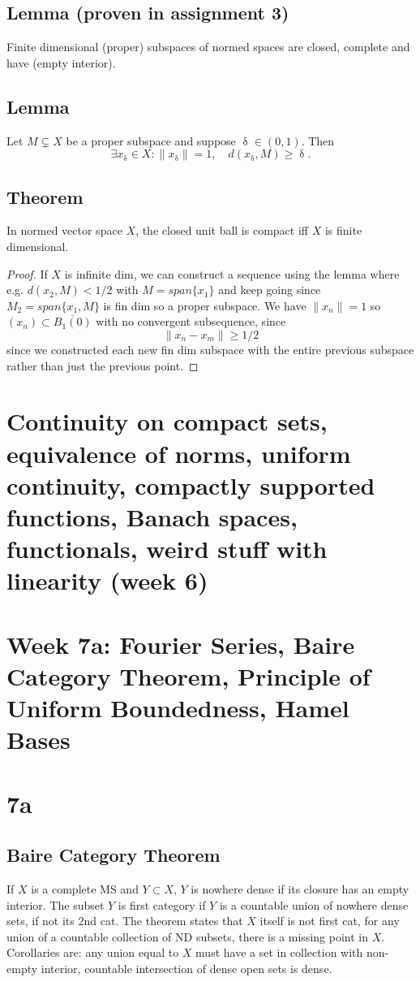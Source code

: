 \documentclass{article}
\DeclareMathOperator\del{\delta}
\begin{document}
\subsection*{Lemma (proven in assignment 3)}
Finite dimensional (proper) subspaces of normed spaces are closed, complete and have (empty interior).
\subsection*{Lemma}
Let $M \subsetneq X$ be a proper subspace and suppose $\del \in (0,1)$. Then $$
\exists x_{\del} \in X: \|x_{\del}\| = 1, \quad d(x_{\del},M) \geq \del.
$$
\subsection*{Theorem}
In normed vector space $X$, the closed unit ball is
compact iff $X$ is finite dimensional.
\begin{proof}
If $X$ is infinite dim, we can construct a sequence using the lemma where e.g. $d(x_2,M) < 1 \slash 2$
with $M = span \{ x_1 \}$ and keep
going since $M_2 = span \{ x_1,M \}$ is fin dim so a proper subspace. We have $\|x_n\| = 1$ so $(x_n) \subset \overline{B_1(0)}$ with no convergent subsequence, since $$
\|x_n-x_m\| \geq 1 \slash 2
$$
since we constructed each new fin dim subspace with the entire previous subspace rather than just the previous point.
\end{proof}
\section*{Continuity on compact sets, equivalence of norms, uniform continuity, compactly supported functions, Banach spaces, functionals, weird stuff with linearity (week 6)}
\section*{Week 7a: Fourier Series, Baire Category Theorem,
Principle of Uniform Boundedness, Hamel Bases}
\section*{7a}
\subsection*{Baire Category Theorem}
If $X$ is a complete MS and $Y \subset X$,
$Y$ is nowhere dense if its closure has an empty interior.
The subset $Y$ is first category if $Y$ is a countable union of nowhere dense sets, if not its 2nd cat.
The theorem states that $X$ itself is not first cat,
for any union of a countable collection of ND subsets,
there is a missing point in $X$. Corollaries are: any union equal to $X$ must have a set in collection with non-empty interior, countable intersection of dense open sets is dense.
\end{document}
